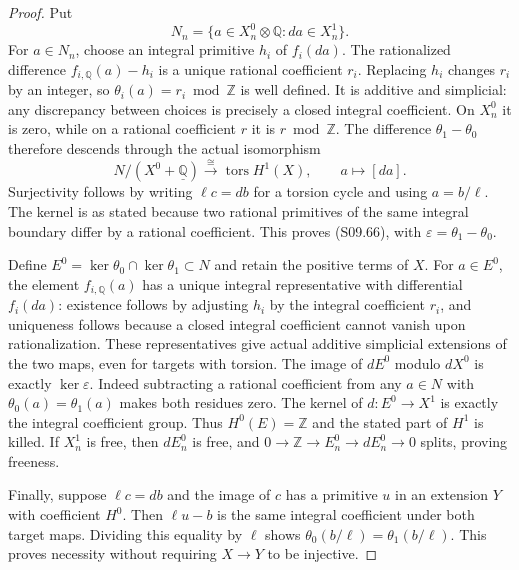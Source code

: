 \begin{proof}
Put
\[
 N_n=\{a\in X_n^0\otimes\mathbb Q:da\in X_n^1\}.
 \tag{S09.67}
\]
For $a\in N_n$, choose an integral primitive $h_i$
of $f_i(da)$.  The rationalized difference
$f_{i,\mathbb Q}(a)-h_i$ is a unique rational
coefficient $r_i$.  Replacing $h_i$ changes $r_i$
by an integer, so
$\theta_i(a)=r_i\bmod\mathbb Z$ is well defined.
It is additive and simplicial: any discrepancy
between choices is precisely a closed integral
coefficient.  On $X_n^0$ it is zero, while on a
rational coefficient $r$ it is $r\bmod\mathbb Z$.
The difference $\theta_1-\theta_0$ therefore descends
through the actual isomorphism
\[
 N/(X^0+\underline{\mathbb Q})
       \xrightarrow{\ \cong\ }\operatorname{tors}H^1(X),
                 \qquad a\longmapsto[da].           \tag{S09.68}
\]
Surjectivity follows by writing $\ell c=db$ for a
torsion cycle and using $a=b/\ell$.  The kernel
is as stated because two rational primitives of
the same integral boundary differ by a rational
coefficient.  This proves (S09.66), with
$\varepsilon=\theta_1-\theta_0$.

Define $E^0=\ker\theta_0\cap\ker\theta_1\subset N$
and retain the positive terms of $X$.
For $a\in E^0$, the element $f_{i,\mathbb Q}(a)$
has a unique integral representative with differential
$f_i(da)$: existence follows by adjusting $h_i$ by
the integral coefficient $r_i$, and uniqueness
follows because a closed integral coefficient cannot
vanish upon rationalization.  These representatives
give actual additive simplicial extensions of the
two maps, even for targets with torsion.
The image of $dE^0$ modulo $dX^0$ is exactly
$\ker\varepsilon$.  Indeed subtracting a rational
coefficient from any $a\in N$ with
$\theta_0(a)=\theta_1(a)$ makes both residues zero.
The kernel of $d:E^0\to X^1$ is exactly the
integral coefficient group.  Thus $H^0(E)=\mathbb Z$
and the stated part of $H^1$ is killed.
If $X_n^1$ is free, then $dE_n^0$ is free, and
$0\to\mathbb Z\to E_n^0\to dE_n^0\to0$ splits,
proving freeness.

Finally, suppose $\ell c=db$ and the image of $c$
has a primitive $u$ in an extension $Y$ with
coefficient $H^0$.  Then $\ell u-b$ is the same
integral coefficient under both target maps.
Dividing this equality by $\ell$ shows
$\theta_0(b/\ell)=\theta_1(b/\ell)$.  This proves
necessity without requiring $X\to Y$ to be injective.
\end{proof}


